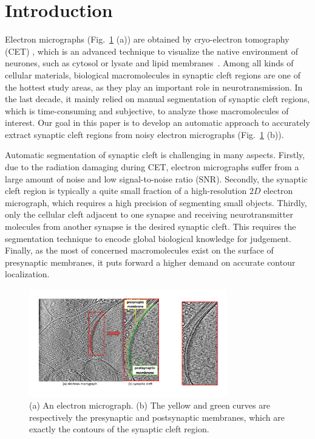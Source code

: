 \section{Introduction}
\label{sec:intro}
Electron micrographs (Fig.~\ref{fig:img} (a)) are obtained by cryo-electron tomography (CET) \cite{Hawkes2007}, which is an advanced technique to visualize the native environment of neurones, such as cytosol or lysate and lipid membranes~\cite{Lucic2005a}.
%
Among all kinds of cellular materials, biological macromolecules in synaptic cleft regions are one of the hottest study areas, as they play an important role in neurotransmission.
%
In the last decade, it mainly relied on manual segmentation of synaptic cleft regions, which is time-consuming and subjective, to analyze those macromolecules of interest.
%
Our goal in this paper is to develop an automatic approach to accurately extract synaptic cleft regions from noisy electron micrographs (Fig.~\ref{fig:img} (b)).


Automatic segmentation of synaptic cleft is challenging in many aspects.
Firstly, due to the radiation damaging during CET, electron micrographs suffer from a large amount of noise and low signal-to-noise ratio (SNR).
Secondly, the synaptic cleft region is typically a quite small fraction of a high-resolution $2D$ electron micrograph, which requires a high precision of segmenting small objects.
Thirdly, only the cellular cleft adjacent to one synapse and receiving neurotransmitter molecules from another synapse is the desired synaptic cleft. This requires the segmentation technique to encode  global biological knowledge for judgement.
Finally, as the most of concerned macromolecules exist on the surface of presynaptic membranes, it puts forward a higher demand on accurate contour localization.

\begin{figure}[t]
    \begin{center}
        \includegraphics[width=3.4in]{figs/FigImg.pdf}
   \end{center}
\caption{(a) An electron micrograph. 
            (b) The yellow and green curves are respectively the presynaptic and postsynaptic membranes, which are exactly the contours of the synaptic cleft region.}
\label{fig:img}
\end{figure}

